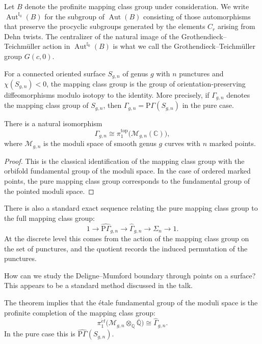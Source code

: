 \medskip\noindent
Let $B$ denote the profinite mapping class
group under consideration. We write
\(\operatorname{Aut}^{\mathbb{I}_0}(B)\) for
the subgroup of \(\operatorname{Aut}(B)\)
consisting of those automorphisms that
preserve the procyclic subgroups generated by
the elements \(C_r\) arising from Dehn
twists. The centralizer of the natural image
of the Grothendieck--Teichm\"uller action in
\(\operatorname{Aut}^{\mathbb{I}_0}(B)\) is
what we call the Grothendieck--Teichm\"uller
group \(G(c,0)\).

\medskip\noindent
For a connected oriented surface
\(S_{g,n}\) of genus \(g\) with \(n\)
punctures and \(\chi(S_{g,n})<0\), the
mapping class group is
the group of orientation-preserving
diffeomorphisms modulo isotopy to the
identity. More precisely, if
\(\Gamma_{g,n}\) denotes the mapping class
group of \(S_{g,n}\), then
\(\Gamma_{g,n}=\mathrm{P}\Gamma(S_{g,n})\)
in the pure case.

\begin{theorem}\label{thm:mapping-class-moduli-space}
There is a natural isomorphism
$$
\Gamma_{g,n}\cong
\pi_1^{\mathrm{top}}
\bigl(\mathcal{M}_{g,n}(\mathbb{C})\bigr),
$$
where \(\mathcal{M}_{g,n}\) is the moduli
space of smooth genus \(g\) curves with
\(n\) marked points.
\end{theorem}

\begin{proof}
This is the classical identification of the
mapping class group with the orbifold
fundamental group of the moduli space. In the
case of ordered marked points, the pure
mapping class group corresponds to the
fundamental group of the pointed moduli
space.
\end{proof}

\medskip\noindent
There is also a standard exact sequence
relating the pure mapping class group to the
full mapping class group:
$$
1\to \widehat{\mathrm{P}\Gamma}_{g,n}
\to \widehat{\Gamma}_{g,n}
\to \Sigma_n
\to 1.
$$
At the discrete level this comes from the
action of the mapping class group on the set
of punctures, and the quotient records the
induced permutation of the punctures.

\begin{remark}
How can we study the Deligne--Mumford
boundary through points on a surface? This
appears to be a standard method discussed in
the talk.
\end{remark}

\medskip\noindent
The theorem implies that the \'etale
fundamental group of the moduli space is the
profinite completion of the mapping class
group:
$$
\pi_1^{\acute{e}t}
\bigl(\mathcal{M}_{g,n}\otimes_{\mathbb{Q}}\overline{\mathbb{Q}}\bigr)
\cong
\widehat{\Gamma}_{g,n}.
$$
In the pure case this is
\(\widehat{\mathrm{P}\Gamma}(S_{g,n})\).

